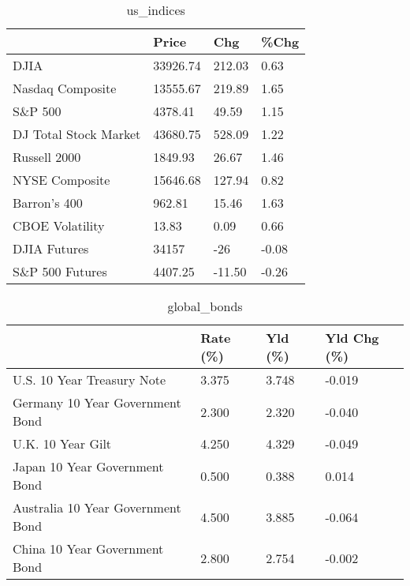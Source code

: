 \documentclass{article}%
\begin{document}
%


\begin{table}[htbp]%
\caption{us\_indices}%
\centering%
\begin{adjustbox}{width=1\textwidth}%
\begin{tabular}{llll}
\toprule
                      &    Price &    Chg &  \%Chg \\
\midrule
                 DJIA & 33926.74 & 212.03 &  0.63 \\
     Nasdaq Composite & 13555.67 & 219.89 &  1.65 \\
              S\&P 500 &  4378.41 &  49.59 &  1.15 \\
DJ Total Stock Market & 43680.75 & 528.09 &  1.22 \\
         Russell 2000 &  1849.93 &  26.67 &  1.46 \\
       NYSE Composite & 15646.68 & 127.94 &  0.82 \\
         Barron's 400 &   962.81 &  15.46 &  1.63 \\
      CBOE Volatility &    13.83 &   0.09 &  0.66 \\
         DJIA Futures &    34157 &    -26 & -0.08 \\
      S\&P 500 Futures &  4407.25 & -11.50 & -0.26 \\
\bottomrule
\end{tabular}
%
\end{adjustbox}%
\end{table}

%


\begin{table}[htbp]%
\caption{global\_bonds}%
\centering%
\begin{adjustbox}{width=1\textwidth}%
\begin{tabular}{llll}
\toprule
                                  & Rate (\%) & Yld (\%) & Yld Chg (\%) \\
\midrule
       U.S. 10 Year Treasury Note &    3.375 &   3.748 &      -0.019 \\
  Germany 10 Year Government Bond &    2.300 &   2.320 &      -0.040 \\
                U.K. 10 Year Gilt &    4.250 &   4.329 &      -0.049 \\
    Japan 10 Year Government Bond &    0.500 &   0.388 &       0.014 \\
Australia 10 Year Government Bond &    4.500 &   3.885 &      -0.064 \\
    China 10 Year Government Bond &    2.800 &   2.754 &      -0.002 \\
\bottomrule
\end{tabular}
%
\end{adjustbox}%
\end{table}
\end{document}

